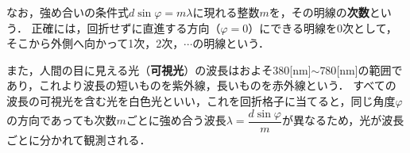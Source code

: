 なお，強め合いの条件式$d\sin \varphi =m\lambda$に現れる整数$m$を，その明線の{\bf 次数}という．
正確には，回折せずに直進する方向（$\varphi =0$）にできる明線を0次として，そこから外側へ向かって1次，2次，$\cdots$の明線という．

また，人間の目に見える光（{\bf 可視光}）の波長はおよそ$380$[nm]$\sim 780$[nm]の範囲であり，これより波長の短いものを紫外線，長いものを赤外線という．
すべての波長の可視光を含む光を白色光といい，これを回折格子に当てると，同じ角度$\varphi$の方向であっても次数$m$ごとに強め合う波長$\lambda =\dfrac{d\sin \varphi}{m}$が異なるため，光が波長ごとに分かれて観測される．

\bsNeed{95mm}
